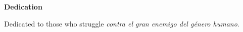 

\begin{center}
	
	\vspace*{5\baselineskip}
	\textbf{\large Dedication}
\end{center}


\begin{flushleft}
	\hspace{10mm}Dedicated to those who struggle \textit{contra el gran enemigo del género humano}.
\end{flushleft}






